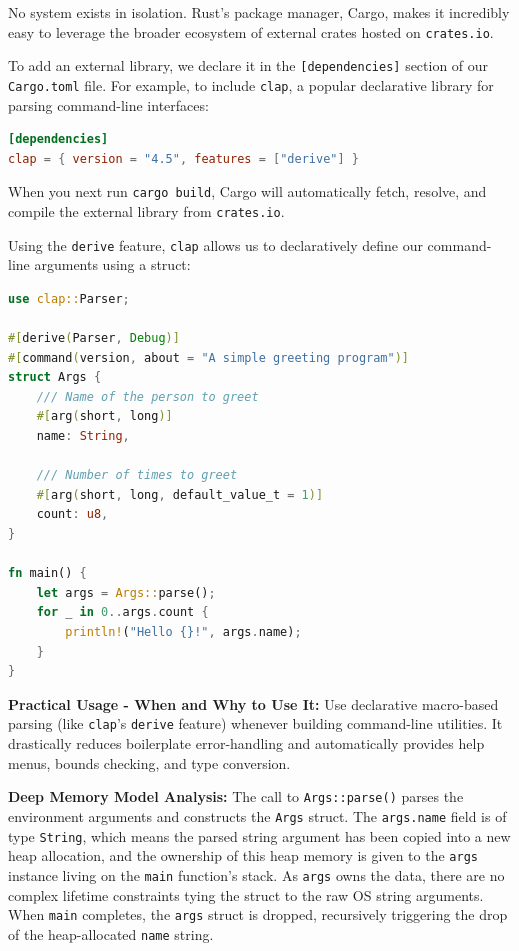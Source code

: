 No system exists in isolation. Rust's package manager, Cargo, makes it incredibly easy to leverage the broader ecosystem of external crates hosted on \texttt{crates.io}. 

To add an external library, we declare it in the \texttt{[dependencies]} section of our \texttt{Cargo.toml} file. For example, to include \texttt{clap}, a popular declarative library for parsing command-line interfaces:

\begin{lstlisting}[language=toml]
[dependencies]
clap = { version = "4.5", features = ["derive"] }
\end{lstlisting}

When you next run \texttt{cargo build}, Cargo will automatically fetch, resolve, and compile the external library from \texttt{crates.io}. 

Using the \texttt{derive} feature, \texttt{clap} allows us to declaratively define our command-line arguments using a struct:

\begin{lstlisting}[language=Rust]
use clap::Parser;

#[derive(Parser, Debug)]
#[command(version, about = "A simple greeting program")]
struct Args {
    /// Name of the person to greet
    #[arg(short, long)]
    name: String,

    /// Number of times to greet
    #[arg(short, long, default_value_t = 1)]
    count: u8,
}

fn main() {
    let args = Args::parse();
    for _ in 0..args.count {
        println!("Hello {}!", args.name);
    }
}
\end{lstlisting}

\textbf{Practical Usage - When and Why to Use It:} Use declarative macro-based parsing (like \texttt{clap}'s \texttt{derive} feature) whenever building command-line utilities. It drastically reduces boilerplate error-handling and automatically provides help menus, bounds checking, and type conversion.

\textbf{Deep Memory Model Analysis:} The call to \texttt{Args::parse()} parses the environment arguments and constructs the \texttt{Args} struct. The \texttt{args.name} field is of type \texttt{String}, which means the parsed string argument has been copied into a new heap allocation, and the ownership of this heap memory is given to the \texttt{args} instance living on the \texttt{main} function's stack. As \texttt{args} owns the data, there are no complex lifetime constraints tying the struct to the raw OS string arguments. When \texttt{main} completes, the \texttt{args} struct is dropped, recursively triggering the drop of the heap-allocated \texttt{name} string.

